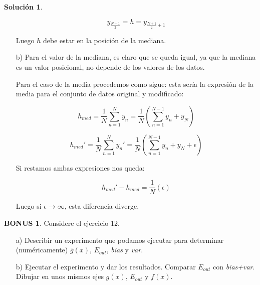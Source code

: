 \documentclass[a4paper, 11pt]{article}
\theoremstyle{definition}
\newtheorem*{solucion}{Solución}
\newtheorem*{bonus}{BONUS}
\begin{document}
\begin{solucion}
\begin{enumerate}
      $$ y_{\frac{N+1}{2}} = h = y_{\frac{N+1}{2}+1} $$

      Luego $h$ debe estar en la posición de la mediana.

      \item[b)] Para el valor de la mediana, es claro que se queda igual, ya que la mediana es un valor posicional, no depende de los valores de los datos.

      Para el caso de la media procedemos como sigue: esta sería la expresión de la media para el conjunto de datos original y modificado:

      $$ h_{med} = \frac{1}{N} \sum_{n=1}^N{y_n} = \frac{1}{N} \left( \sum_{n=1}^{N-1}{y_n} + y_N \right)$$

      $$ h_{med}' = \frac{1}{N} \sum_{n=1}^N{y_n'} = \frac{1}{N} \left( \sum_{n=1}^{N-1}{y_n} + y_N + \epsilon \right)$$

      Si restamos ambas expresiones nos queda:

      $$ h_{med}' - h_{med} = \frac{1}{N} \left(\epsilon \right)$$

      Luego si $\epsilon \rightarrow \infty$, esta diferencia diverge.

    \end{enumerate}

  \end{solucion}

  \begin{bonus}
    Considere el ejercicio 12.
    \begin{itemize}
      \item[a)] Describir un experimento que podamos ejecutar para determinar (numéricamente) $\overline{g}(x)$, $E_{out}$, \emph{bias} y \emph{var}.

      \item[b)] Ejecutar el experimento y dar los resultados. Comparar $E_{out}$ con \emph{bias+var}. Dibujar en unos mismos ejes $g(x)$, $E_{out}$ y $f(x)$.
    \end{itemize}
  \end{bonus}
\end{document}
